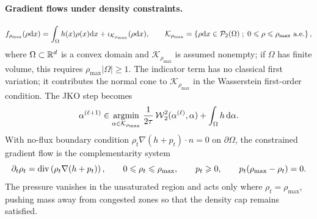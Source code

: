 \paragraph{Gradient flows under density constraints.}
\begin{equation}\label{eq-density-constrained-energy}
f_{\rho_{\max}}(\rho\d x)=\int_\Omega h(x)\rho(x)\d x+
\iota_{\mathcal K_{\rho_{\max}}}(\rho\d x),
\qquad
\mathcal K_{\rho_{\max}}=
\enscond{\rho\d x\in\Pp_2(\Omega)}{0\leq\rho\leq\rho_{\max}\ \text{a.e.}},
\end{equation}
where $\Omega\subset\mathbb{R}^d$ is a convex domain and $\mathcal K_{\rho_{\max}}$ is assumed nonempty; if $\Omega$ has finite volume, this requires $\rho_{\max}|\Omega|\geq1$. The indicator term has no classical first variation; it contributes the normal cone to $\mathcal K_{\rho_{\max}}$ in the Wasserstein first-order condition. The JKO step becomes
\begin{equation}\label{eq-density-constrained-jko}
\alpha^{(\ell+1)}
\in
\underset{\alpha\in\mathcal K_{\rho_{\max}}}{\operatorname{argmin}}\;
\frac{1}{2\tau}\operatorname{\mathcal{W}}_2^2(\alpha^{(\ell)},\alpha)+\int_\Omega h\,\mathrm{d}\alpha.
\end{equation}
With no-flux boundary condition $\rho_t\nabla(h+p_t)\cdot n=0$ on $\partial\Omega$, the constrained gradient flow is the complementarity system
\begin{equation}\label{eq-density-constrained-pressure-flow}
\partial_t\rho_t=\operatorname{div}\left(\rho_t\nabla(h+p_t)\right),
\qquad
0\leqslant\rho_t\leqslant\rho_{\max},
\qquad
p_t\geqslant0,
\qquad
p_t(\rho_{\max}-\rho_t)=0.
\end{equation}
The pressure vanishes in the unsaturated region and acts only where $\rho_t=\rho_{\max}$, pushing mass away from congested zones so that the density cap remains satisfied.

